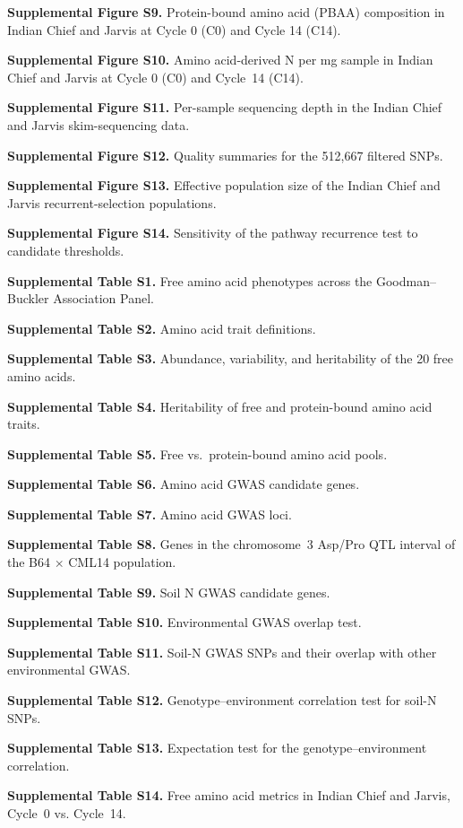 \documentclass[namedate,unnumsec,webpdf,contemporary,large]{oup-authoring-template}
\begin{document}
\textbf{Supplemental Figure S9.} Protein-bound amino acid (PBAA) composition in Indian Chief and Jarvis at Cycle 0 (C0) and Cycle 14 (C14).

\textbf{Supplemental Figure S10.} Amino acid-derived N per mg sample in Indian Chief and Jarvis at Cycle 0 (C0) and Cycle~14 (C14).

\textbf{Supplemental Figure S11.} Per-sample sequencing depth in the Indian Chief and Jarvis skim-sequencing data.

\textbf{Supplemental Figure S12.} Quality summaries for the 512,667 filtered SNPs.

\textbf{Supplemental Figure S13.} Effective population size of the Indian Chief and Jarvis recurrent-selection populations.

\textbf{Supplemental Figure S14.} Sensitivity of the pathway recurrence test to candidate thresholds.

\textbf{Supplemental Table S1.} Free amino acid phenotypes across the Goodman--Buckler Association Panel.

\textbf{Supplemental Table S2.} Amino acid trait definitions.

\textbf{Supplemental Table S3.} Abundance, variability, and heritability of the 20 free amino acids.

\textbf{Supplemental Table S4.} Heritability of free and protein-bound amino acid traits.

\textbf{Supplemental Table S5.} Free vs.\ protein-bound amino acid pools.

\textbf{Supplemental Table S6.} Amino acid GWAS candidate genes.

\textbf{Supplemental Table S7.} Amino acid GWAS loci.

\textbf{Supplemental Table S8.} Genes in the chromosome~3 Asp/Pro QTL interval of the B64 $\times$ CML14 population.

\textbf{Supplemental Table S9.} Soil N GWAS candidate genes.

\textbf{Supplemental Table S10.} Environmental GWAS overlap test.

\textbf{Supplemental Table S11.} Soil-N GWAS SNPs and their overlap with other environmental GWAS.

\textbf{Supplemental Table S12.} Genotype--environment correlation test for soil-N SNPs.

\textbf{Supplemental Table S13.} Expectation test for the genotype–environment correlation.

\textbf{Supplemental Table S14.} Free amino acid metrics in Indian Chief and Jarvis, Cycle~0 vs. Cycle~14.
\end{document}
